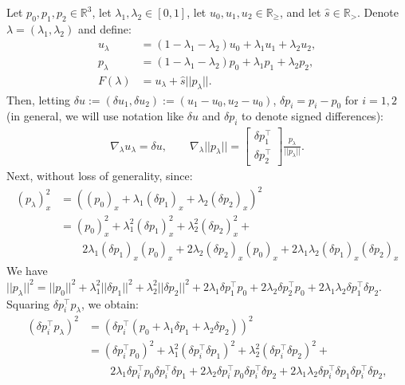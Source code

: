 \documentclass{article}
\theoremstyle{definition}
\begin{document}
Let $p_0, p_1, p_2 \in \mathbb{R}^3$, let
$\lambda_1, \lambda_2 \in [0, 1]$, let
$u_0, u_1, u_2 \in \mathbb{R}_{\geq}$, and let
$\hat{s} \in \mathbb{R}_{>}$. Denote
$\lambda = (\lambda_1, \lambda_2)$ and define:
\begin{align*}
  u_\lambda &= (1 - \lambda_1 - \lambda_2) u_0 + \lambda_1 u_1 + \lambda_2 u_2, \\
  p_\lambda &= (1 - \lambda_1 - \lambda_2) p_0 + \lambda_1 p_1 + \lambda_2 p_2, \\
  F(\lambda) &= u_\lambda + \hat{s} ||p_\lambda||.
\end{align*}
Then, letting
$\delta u := (\delta u_1, \delta u_2) := (u_1 - u_0, u_2 - u_0)$,
$\delta p_i = p_i - p_0$ for $i = 1, 2$ (in general, we will use
notation like $\delta u$ and $\delta p_i$ to denote signed
differences):
\begin{align*}
  \nabla_\lambda u_\lambda = \delta u, \qquad \nabla_\lambda ||p_\lambda|| = \begin{bmatrix} \delta p_1^\top \\ \delta p_2^\top \end{bmatrix} \frac{p_\lambda}{||p_\lambda||}.
\end{align*}
Next, without loss of generality, since:
\begin{align*}
  {(p_\lambda)}_x^2
  &= \left({(p_0)}_x + \lambda_1 {(\delta p_1)}_x + \lambda_2 {(\delta p_2)}_x\right)^2 \\
  &= {(p_0)}_x^2 + \lambda_1^2 {(\delta p_1)}_x^2 + \lambda_2^2 {(\delta p_2)}_x^2 + \\
  &\qquad 2 \lambda_1 {(\delta p_1)}_x {(p_0)}_x + 2 \lambda_2 {(\delta p_2)}_x {(p_0)}_x + 2 \lambda_1 \lambda_2 {(\delta p_1)}_x {(\delta p_2)}_x
\end{align*}
We have
$||p_\lambda||^2 = ||p_0||^2 + \lambda_1^2 ||\delta p_1||^2 +
\lambda_2^2 ||\delta p_2||^2 + 2 \lambda_1 \delta p_1^\top p_0 + 2
\lambda_2 \delta p_2^\top p_0 + 2 \lambda_1 \lambda_2 \delta p_1^\top
\delta p_2$. Squaring $\delta p_i^\top p_\lambda$, we obtain:
\begin{align*}
  {(\delta p_i^\top p_\lambda)}^2
  &= \left(\delta p_i^\top (p_0 + \lambda_1 \delta p_1 + \lambda_2 \delta p_2)\right)^2 \\
  &= {(\delta p_i^\top p_0)}^2 + \lambda_1^2 {(\delta p_i^\top \delta p_1)}^2 + \lambda_2^2 {(\delta p_i^\top \delta p_2)}^2 + \\
  &\qquad 2 \lambda_1 \delta p_i^\top p_0 \delta p_i^\top \delta p_1 + 2 \lambda_2 \delta p_i^\top p_0 \delta p_i^\top \delta p_2  + 2 \lambda_1 \lambda_2 \delta p_i^\top \delta p_1 \delta p_i^\top \delta p_2,
\end{align*}
\end{document}
